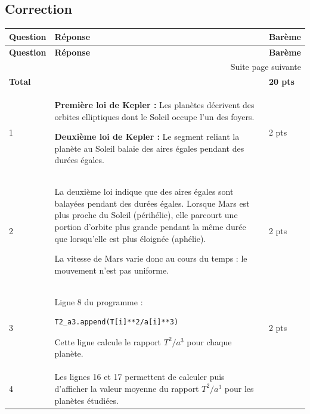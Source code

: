 \documentclass[a4paper,11pt,fleqn]{scrartcl}%
\begin{document}
\begin{center}
\renewcommand{\arraystretch}{1.6}

\section*{Correction}

\renewcommand{\arraystretch}{1.6}

\begin{longtable}{||p{.1\linewidth}|p{.78\linewidth}|p{.07\linewidth}|}
\hline
\textbf{Question} & \textbf{Réponse} & \textbf{Barème} \\
\hline
\endfirsthead

\hline
\textbf{Question} & \textbf{Réponse} & \textbf{Barème} \\
\hline
\endhead

\hline
\multicolumn{3}{r}{Suite page suivante} \\
\hline
\endfoot

\hline
\textbf{Total} & & \textbf{20 pts} \\
\hline
\endlastfoot

1 &
\textbf{Première loi de Kepler :} Les planètes décrivent des orbites elliptiques dont le Soleil occupe l'un des foyers. 

\textbf{Deuxième loi de Kepler :} Le segment reliant la planète au Soleil balaie des aires égales pendant des durées égales. 
& 2 pts \\

\hline

2 &
La deuxième loi indique que des aires égales sont balayées pendant des durées égales.  
Lorsque Mars est plus proche du Soleil (périhélie), elle parcourt une portion d'orbite plus grande pendant la même durée que lorsqu'elle est plus éloignée (aphélie).  

La vitesse de Mars varie donc au cours du temps : le mouvement n'est pas uniforme.
& 2 pts \\

\hline

3 &
Ligne 8 du programme :

\begin{verbatim}
T2_a3.append(T[i]**2/a[i]**3)
\end{verbatim}

Cette ligne calcule le rapport $T^2/a^3$ pour chaque planète.
& 2 pts \\

\hline

4 &
Les lignes 16 et 17 permettent de calculer puis d'afficher la valeur moyenne du rapport $T^2/a^3$ pour les planètes étudiées.


\end{longtable}
\end{center}
\end{document}
